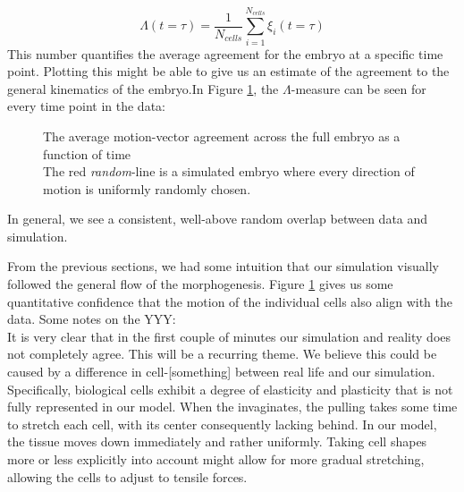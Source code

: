 \begin{equation}
     \Lambda(t=\tau) = \frac{1}{N_{cells}} \sum_{i=1}^{N_{cells}}\xi_i(t=\tau)
\end{equation}
This number quantifies the average agreement for the embryo at a specific time point. Plotting this  might be able to give us an estimate of the agreement to the general kinematics of the embryo.\reph In Figure \ref{fig:motionAgreement}, the $\Lambda$-measure can be seen for every time point in the data:

\begin{figure}[H]
    \centering
    \caption{The average motion-vector agreement across the full embryo as a function of time\\
    The red \textit{random}-line is a simulated embryo where every direction of motion is uniformly randomly chosen. }
    \label{fig:motionAgreement}
\end{figure}





In general, we see a consistent, well-above random overlap between data and simulation. 

From the previous sections, we had some intuition that our simulation visually followed the general flow of the morphogenesis. Figure \ref{fig:motionAgreement} gives us some quantitative confidence that the motion of the individual cells also align with the data. 
Some notes on the YYY:\\

It is very clear that in the first couple of minutes our simulation and reality does not completely agree. This will be a recurring theme. We believe this could be caused by a difference in cell-[something] between real life and our simulation. Specifically, biological cells exhibit a degree of elasticity and plasticity that is not fully represented in our model. When the  invaginates, the pulling takes some time to stretch each cell, with its center consequently lacking behind. In our model, the tissue moves down immediately and rather uniformly. Taking cell shapes more or less explicitly into account might allow for more gradual stretching, allowing the cells to adjust to tensile forces.\\

